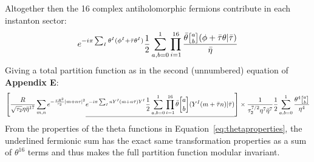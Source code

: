 \documentclass[11pt, class=article, crop=false]{standalone}
\begin{document}
\begin{enumerate}
		Altogether then the 16 complex antiholomorphic fermions contribute in each instanton sector: 
		\[
			e^{-i \pi \sum_I \theta^I (\phi^I + \bar \tau \theta^I)} \frac12 \sum_{a,b=0}^1 \prod_{i=1}^{16} \frac{\bar \theta \twist ab (\phi + \bar \tau \theta  | \bar \tau)}{\bar \eta}
		\]
		Giving a total partition function as in the second (unnumbered) equation of \textbf{Appendix E}:
		\[
			\left[\frac{R}{\sqrt{\tau_2} \eta \bar \eta^{17}} \sum_{m,n} e^{-\frac{\pi R^2}{\tau_2} |m + n \tau|^2} \underline{e^{-i \pi \sum_I n Y^I (m + n \bar \tau) Y^I}\frac12 \sum_{a,b=0}^1  \prod_{i=1}^{16} \bar \theta \twist ab (Y^I (m + \bar \tau n) | \bar \tau)} \right] \times \frac{1}{\tau_2^{7/2} \eta^7 \bar \eta^7} \frac12 \sum_{a,b = 0}^1 \frac{\theta^4 \twist a b}{\eta^4}
		\]
		From the properties of the theta functions in Equation~\eqref{eq:thetaproperties}, the underlined fermionic sum has the exact same transformation properties as a sum of $\theta^{16}$ terms and thus makes the full partition function modular invariant.
		

\end{enumerate}
\end{document}
